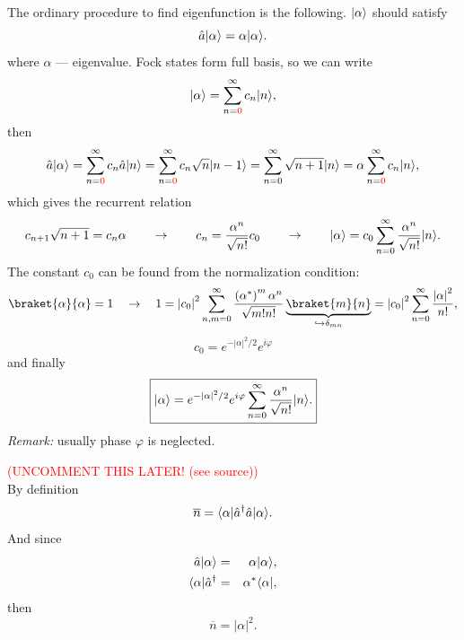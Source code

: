 The ordinary procedure to find eigenfunction is the following. $\lvert\alpha\rangle$ should satisfy
\begin{equation}
	\hat{a} \lvert\alpha\rangle = \alpha \lvert\alpha\rangle.
\end{equation}
where $\alpha$ --- eigenvalue.
Fock states form full basis, so we can write
\begin{equation}
	\lvert\alpha\rangle = \sum_{n={\textcolor{red} 0}}^{\infty} c_n \lvert n\rangle,
\end{equation}
then
\begin{equation}
	\hat{a} \lvert\alpha\rangle = \sum_{n={\textcolor{red} 0}}^{\infty} c_n \hat{a} \lvert n\rangle = \sum_{n={\textcolor{red} 0}}^{\infty} c_n \sqrt{n} \lvert n-1\rangle = \sum_{n=0}^{\infty} \sqrt{n+1} \lvert n\rangle = \alpha \sum_{n={\textcolor{red} 0}}^{\infty} c_n \lvert n\rangle,
\end{equation}
which gives the recurrent relation
\begin{equation}
	c_{n+1} \sqrt{n+1} = c_n \alpha \qquad \to \qquad c_n = \frac{\alpha^n}{\sqrt{n!}} c_0 \qquad \to \qquad \lvert\alpha\rangle = c_0 \sum_{n=0}^{\infty} \frac{\alpha^n}{\sqrt{n!}} \lvert n\rangle.
\end{equation}
The constant $c_0$ can be found from the normalization condition:
\begin{equation}
	\braket{\alpha}{\alpha} = 1 \quad \to \quad 1 = \left|c_0\right|^2 \sum_{n,m = 0}^{\infty} \frac{\left( \alpha^* \right)^m \alpha^n}{\sqrt{m!n!}} \underbrace{\braket{m}{n}}_{\hookrightarrow  \delta_{mn}} = \left|c_0\right|^2 \sum_{n = 0}^{\infty} \frac{\left|\alpha\right|^2}{n!},
\end{equation}
\begin{equation}
	c_0 = e^{- \left|\alpha\right|^2/2} e^{i \varphi}
\end{equation}
and finally
\begin{equation}
	\boxed{\lvert\alpha\rangle = e^{- \left|\alpha\right|^2/2} e^{i \varphi} \sum_{n = 0}^{\infty} \frac{\alpha^n}{\sqrt{n!}} \lvert n\rangle.}
\end{equation}
\textit{Remark:} usually phase $\varphi$ is neglected.

	\textcolor{red}{(UNCOMMENT THIS LATER! (see source))} \\
	By definition
	\begin{equation}
	\overline{n} = \langle\alpha\rvert \hat{a}^{\dagger} \hat{a} \lvert\alpha\rangle.
	\end{equation}
	And since
	\begin{eqnarray}
	\hat{a} \lvert\alpha\rangle &=& \alpha \lvert\alpha\rangle, \\
	\langle\alpha\rvert \hat{a}^{\dagger}  &=& \alpha^* \langle\alpha\rvert,
	\end{eqnarray}
	then
	\begin{equation}
	\overline{n} = \left| \alpha \right|^2.
	\end{equation}

